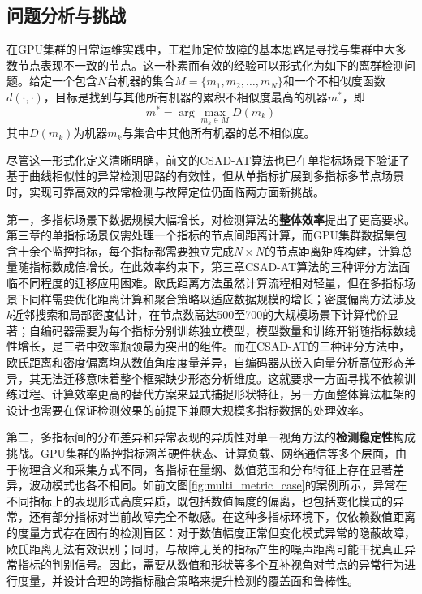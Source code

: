 \subsection{问题分析与挑战}

在GPU集群的日常运维实践中，工程师定位故障的基本思路是寻找与集群中大多数节点表现不一致的节点。这一朴素而有效的经验可以形式化为如下的离群检测问题。给定一个包含$N$台机器的集合$M = \{m_1, m_2, \ldots, m_N\}$和一个不相似度函数$d(\cdot, \cdot)$，目标是找到与其他所有机器的累积不相似度最高的机器$m^*$，即
\begin{equation}
    m^* = \arg \max_{m_k \in M} D(m_k)
\end{equation}
其中$D(m_k)$为机器$m_k$与集合中其他所有机器的总不相似度。

尽管这一形式化定义清晰明确，前文的CSAD-AT算法也已在单指标场景下验证了基于曲线相似性的异常检测思路的有效性，但从单指标扩展到多指标多节点场景时，实现可靠高效的异常检测与故障定位仍面临两方面新挑战。

第一，多指标场景下数据规模大幅增长，对检测算法的\textbf{整体效率}提出了更高要求。第三章的单指标场景仅需处理一个指标的节点间距离计算，而GPU集群数据集包含十余个监控指标，每个指标都需要独立完成$N \times N$的节点距离矩阵构建，计算总量随指标数成倍增长。在此效率约束下，第三章CSAD-AT算法的三种评分方法面临不同程度的迁移应用困难。欧氏距离方法虽然计算流程相对轻量，但在多指标场景下同样需要优化距离计算和聚合策略以适应数据规模的增长；密度偏离方法涉及$k$近邻搜索和局部密度估计，在节点数高达500至700的大规模场景下计算代价显著；自编码器需要为每个指标分别训练独立模型，模型数量和训练开销随指标数线性增长，是三者中效率瓶颈最为突出的组件。而在CSAD-AT的三种评分方法中，欧氏距离和密度偏离均从数值角度度量差异，自编码器从嵌入向量分析高位形态差异，其无法迁移意味着整个框架缺少形态分析维度。这就要求一方面寻找不依赖训练过程、计算效率更高的替代方案来显式捕捉形状特征，另一方面整体算法框架的设计也需要在保证检测效果的前提下兼顾大规模多指标数据的处理效率。

第二，多指标间的分布差异和异常表现的异质性对单一视角方法的\textbf{检测稳定性}构成挑战。GPU集群的监控指标涵盖硬件状态、计算负载、网络通信等多个层面，由于物理含义和采集方式不同，各指标在量纲、数值范围和分布特征上存在显著差异，波动模式也各不相同。如前文图\ref{fig:multi_metric_case}的案例所示，异常在不同指标上的表现形式高度异质，既包括数值幅度的偏离，也包括变化模式的异常，还有部分指标对当前故障完全不敏感。在这种多指标环境下，仅依赖数值距离的度量方式存在固有的检测盲区：对于数值幅度正常但变化模式异常的隐蔽故障，欧氏距离无法有效识别；同时，与故障无关的指标产生的噪声距离可能干扰真正异常指标的判别信号。因此，需要从数值和形状等多个互补视角对节点的异常行为进行度量，并设计合理的跨指标融合策略来提升检测的覆盖面和鲁棒性。

